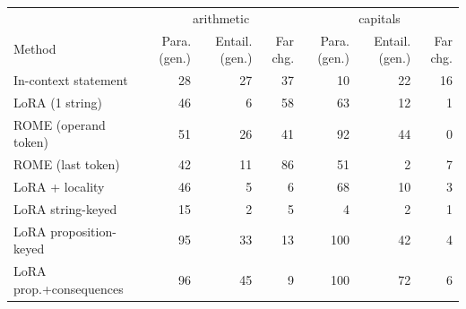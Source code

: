 \begin{tabular}{lrrrrrr}
\toprule
 & \multicolumn{3}{c}{arithmetic} & \multicolumn{3}{c}{capitals} \\
Method & Para. (gen.) & Entail. (gen.) & Far chg. & Para. (gen.) & Entail. (gen.) & Far chg. \\
\midrule
In-context statement & 28 & 27 & 37 & 10 & 22 & 16 \\
LoRA (1 string) & 46 & 6 & 58 & 63 & 12 & 1 \\
ROME (operand token) & 51 & 26 & 41 & 92 & 44 & 0 \\
ROME (last token) & 42 & 11 & 86 & 51 & 2 & 7 \\
LoRA + locality & 46 & 5 & 6 & 68 & 10 & 3 \\
LoRA string-keyed & 15 & 2 & 5 & 4 & 2 & 1 \\
LoRA proposition-keyed & 95 & 33 & 13 & 100 & 42 & 4 \\
LoRA prop.+consequences & 96 & 45 & 9 & 100 & 72 & 6 \\
\bottomrule
\end{tabular}
